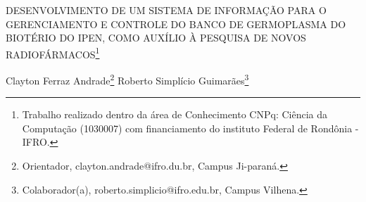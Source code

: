 \documentclass[article,12pt,onesidea,4paper,english,brazil]{abntex2}
\begin{document}
	
	
	\frenchspacing 
	
	\begin{center}
		\LARGE DESENVOLVIMENTO DE UM SISTEMA DE INFORMAÇÃO PARA O
		GERENCIAMENTO E CONTROLE DO BANCO DE GERMOPLASMA DO BIOTÉRIO DO IPEN, COMO AUXÍLIO À PESQUISA DE NOVOS RADIOFÁRMACOS\footnote{Trabalho realizado dentro da área de Conhecimento CNPq: Ciência da Computação (1030007) com
		financiamento do instituto Federal de Rondônia - IFRO.}
		
		\normalsize
		Clayton Ferraz Andrade\footnote{Orientador, clayton.andrade@ifro.du.br, Campus Ji-paraná.} 
		Roberto Simplício Guimarães\footnote{Colaborador(a), roberto.simplicio@ifro.edu.br, Campus Vilhena.} 
	\end{center}
	
\end{document}

